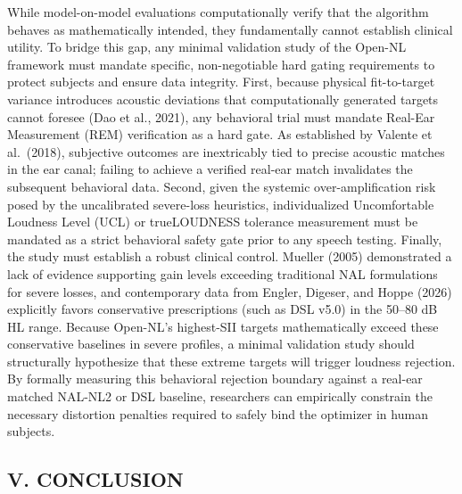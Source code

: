 \documentclass[
  12pt,
]{article}
\begin{document}
While model-on-model evaluations computationally verify that the
algorithm behaves as mathematically intended, they fundamentally cannot
establish clinical utility. To bridge this gap, any minimal validation
study of the Open-NL framework must mandate specific, non-negotiable
hard gating requirements to protect subjects and ensure data integrity.
First, because physical fit-to-target variance introduces acoustic
deviations that computationally generated targets cannot foresee (Dao et
al., 2021), any behavioral trial must mandate Real-Ear Measurement (REM)
verification as a hard gate. As established by Valente et al.~(2018),
subjective outcomes are inextricably tied to precise acoustic matches in
the ear canal; failing to achieve a verified real-ear match invalidates
the subsequent behavioral data. Second, given the systemic
over-amplification risk posed by the uncalibrated severe-loss
heuristics, individualized Uncomfortable Loudness Level (UCL) or
trueLOUDNESS tolerance measurement must be mandated as a strict
behavioral safety gate prior to any speech testing. Finally, the study
must establish a robust clinical control. Mueller (2005) demonstrated a
lack of evidence supporting gain levels exceeding traditional NAL
formulations for severe losses, and contemporary data from Engler,
Digeser, and Hoppe (2026) explicitly favors conservative prescriptions
(such as DSL v5.0) in the 50--80 dB HL range. Because Open-NL's
highest-SII targets mathematically exceed these conservative baselines
in severe profiles, a minimal validation study should structurally
hypothesize that these extreme targets will trigger loudness rejection.
By formally measuring this behavioral rejection boundary against a
real-ear matched NAL-NL2 or DSL baseline, researchers can empirically
constrain the necessary distortion penalties required to safely bind the
optimizer in human subjects.

\subsection{V. CONCLUSION}\label{v.-conclusion}
\end{document}
